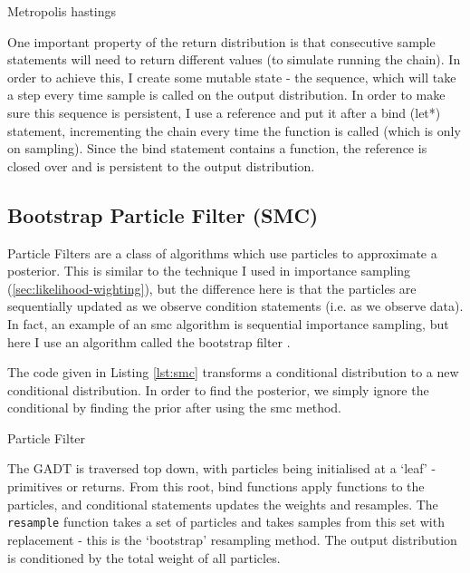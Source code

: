 \begin{listing}[H]
	\centering
	\caption{Metropolis hastings}
	\label{lst:mh}
\end{listing}

One important property of the return distribution is that consecutive sample statements will need to return different values (to simulate running the chain). In order to achieve this, I create some mutable state - the sequence, which will take a step every time sample is called on the output distribution. In order to make sure this sequence is persistent, I use a reference and put it after a bind (let*) statement, incrementing the chain every time the function is called (which is only on sampling). Since the bind statement contains a function, the reference is closed over and is persistent to the output distribution.
				
			
\subsection{Bootstrap Particle Filter (SMC)} \label{sec:pf}
Particle Filters are a class of algorithms which use particles to approximate a posterior. This is similar to the technique I used in importance sampling (\ref{sec:likelihood-wighting}), but the difference here is that the particles are sequentially updated as we observe condition statements (i.e. as we observe data). In fact, an example of an smc algorithm is sequential importance sampling, but here I use an algorithm called the bootstrap filter \cite{particlefilter}.
				
The code given in Listing \ref{lst:smc} transforms a conditional distribution to a new conditional distribution. In order to find the posterior, we simply ignore the conditional by finding the prior after using the smc method.
				
\begin{listing}[!htb]
	\centering
	\caption{Particle Filter}
	\label{lst:smc}
\end{listing}
				
The GADT is traversed top down, with particles being initialised at a `leaf' - primitives or returns. From this root, bind functions apply functions to the particles, and conditional statements updates the weights and resamples. The \texttt{resample} function takes a set of particles and takes samples from this set with replacement - this is the `bootstrap' resampling method. The output distribution is conditioned by the total weight of all particles.
				
